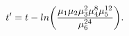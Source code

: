 \begin{equation}
t^\prime=t - ln\biggl({\mu_1\mu_2\mu_3^2\mu_4^8\mu_5^{12}\over\mu_6^{24}}\biggr).
\end{equation}

